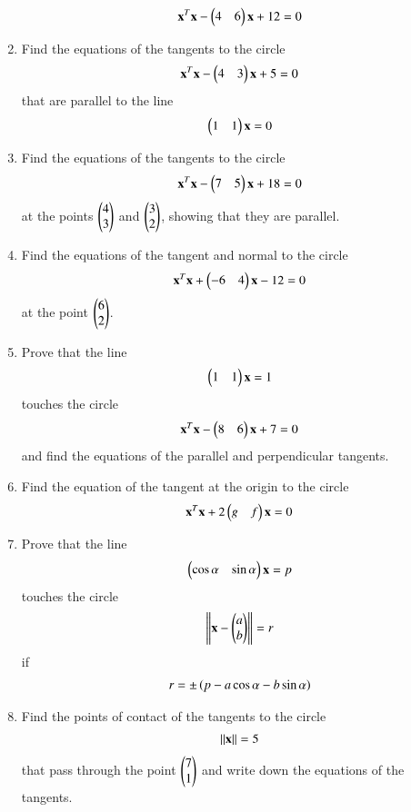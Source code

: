 \begin{enumerate}[label=\arabic*.,ref=\thesubsection.\theenumi]
\begin{align}
\mathbf{x}^T\mathbf{x}-\begin{pmatrix}4 & 6\end{pmatrix}\mathbf{x}+12 = 0
\end{align}
\item  Find the equations of the tangents to the circle
\begin{align}
\mathbf{x}^T\mathbf{x}-\begin{pmatrix}4 & 3\end{pmatrix}\mathbf{x}+5 = 0
\end{align}
that are parallel to the line 
\begin{align}
\begin{pmatrix}1 & 1\end{pmatrix}\mathbf{x}=0
\end{align}
\renewcommand{\theequation}{\theenumi}
\item Find the equations of the tangents to the circle
\begin{align}
\mathbf{x}^T\mathbf{x}-\begin{pmatrix}7 & 5\end{pmatrix}\mathbf{x}+18 = 0
\end{align}
at the points $\begin{pmatrix}4\\3\end{pmatrix}$ and $\begin{pmatrix}3\\2\end{pmatrix}$, showing that they are parallel.
\item Find the equations of the tangent and normal to the circle
\begin{align}
\mathbf{x}^T\mathbf{x}+\begin{pmatrix}-6 & 4\end{pmatrix}\mathbf{x}-12 = 0
\end{align}
at the point $\begin{pmatrix}6\\2\end{pmatrix}$.
\item Prove that the line 
\begin{align}
\begin{pmatrix}1 & 1\end{pmatrix}\mathbf{x} = 1
\end{align}
touches the circle
\begin{align}
\mathbf{x}^T\mathbf{x}-\begin{pmatrix}8 & 6\end{pmatrix}\mathbf{x}+7 = 0
\end{align}
and find the equations of the parallel and perpendicular tangents.
\renewcommand{\theequation}{\theenumi}
\item Find the equation of the tangent at the origin to the circle
\begin{align}
\mathbf{x}^T\mathbf{x}+2\begin{pmatrix}g & f\end{pmatrix}\mathbf{x} = 0
\end{align}
%
\item Prove that the line 
\begin{align}
\begin{pmatrix}\cos\alpha &\sin\alpha\end{pmatrix}\mathbf{x} = p
\end{align}
touches the circle
\begin{align}
\left\lVert\mathbf{x}-\begin{pmatrix}a\\b\end{pmatrix}\right\rVert=r
\end{align}
if
\begin{align}
r = \pm \left(p-a\cos\alpha-b\sin\alpha\right)
\end{align}
\renewcommand{\theequation}{\theenumi}
\item Find the points of contact of the tangents to the circle
\begin{align}
\left\lVert\mathbf{x}\right\rVert=5
\end{align}
that pass through the point $\begin{pmatrix}7\\1\end{pmatrix}$ and write down the equations of the tangents.


\end{enumerate}
